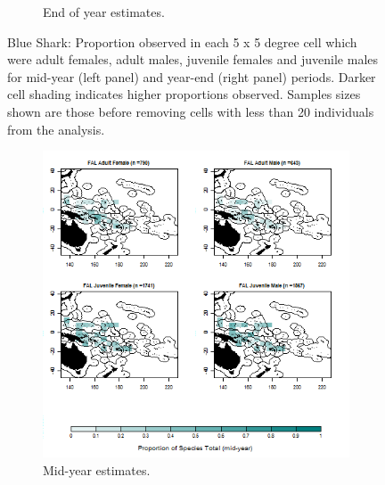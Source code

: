\documentclass[12pt]{SCreport}
\begin{document}
\begin{landscape}
\begin{figure}
\begin{subfigure}[b]{0.6\textwidth}
       \caption{End of year estimates.}
       \label{fig:test2}
   \end{subfigure}
\caption{Blue Shark:  Proportion observed in each 5 x 5 degree cell which were adult females, adult males, juvenile females and juvenile males for mid-year (left panel) and year-end (right panel) periods. Darker cell shading indicates higher proportions observed. Samples sizes shown are those before removing cells with less than 20 individuals from the analysis. }
\label{fig:test} 
\end{figure}
\end{landscape}


\begin{landscape}
\begin{figure}
\centering
   \begin{subfigure}[b]{0.6\textwidth}
       \includegraphics[width=\textwidth]{../GRAPHICS/Defined/BI_22_Map_maturity_sex_FAL_MY}
       \caption{Mid-year estimates.}
       \label{fig:test1}
   \end{subfigure}
   \begin{subfigure}[b]{0.6\textwidth}

\end{subfigure}
\end{figure}
\end{landscape}
\end{document}
